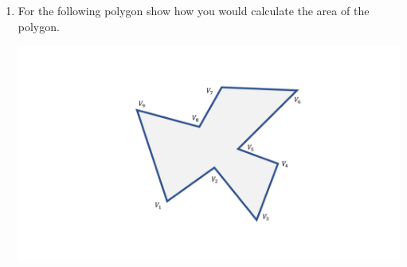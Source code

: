 \documentclass[a4paper,12pt]{article}
\begin{document}
\begin{enumerate}
\newpage

\item For the following polygon show how you would calculate the area of the polygon.

\vspace{20pt}
\begin{center}
\includegraphics[width=0.7\linewidth]{../images/polygon_area.pdf}
\end{center}

\end{enumerate}
\end{document}
